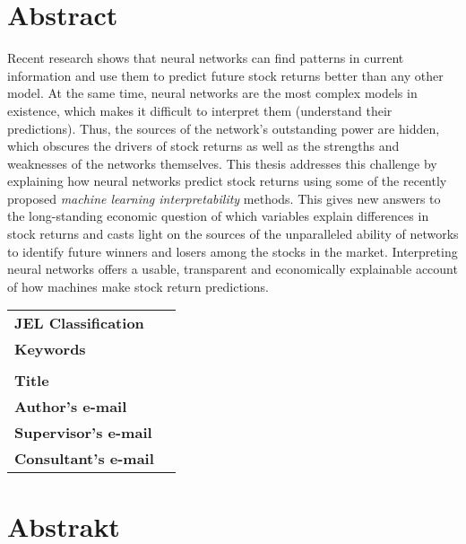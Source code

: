 \section*{Abstract}


Recent research shows that neural networks can find patterns in current information and use them to predict future stock returns better than any other model. At the same time, neural networks are the most complex models in existence, which makes it difficult to interpret them (understand their predictions). Thus, the sources of the network's outstanding power are hidden, which obscures the drivers of stock returns as well as the strengths and weaknesses of the networks themselves. This thesis addresses this challenge by explaining how neural networks predict stock returns using some of the recently proposed \textit{machine learning interpretability} methods. This gives new answers to the long-standing economic question of which variables explain differences in stock returns and casts light on the sources of the unparalleled ability of networks to identify future winners and losers among the stocks in the market. Interpreting neural networks offers a usable, transparent and economically explainable account of how machines make stock return predictions. 

\bigskip

\begin{tabular}{lp{8.6cm}}
		\textbf{JEL Classification} & \JEL \\
		\textbf{Keywords} & \Keywords \\
 		& \\
		\textbf{Title} & \Bookname \\
 		\textbf{Author's e-mail} & \texttt{\href{mailto:\Email}{\Email}}\\
		\textbf{Supervisor's e-mail} & \texttt{\href{mailto:\EmailSup}{\EmailSup}}\\
		\textbf{Consultant's e-mail} & \texttt{\href{mailto:\EmailCon}{\EmailCon}}\\
\end{tabular}

\bigskip

\section*{Abstrakt}\label{abstract}

